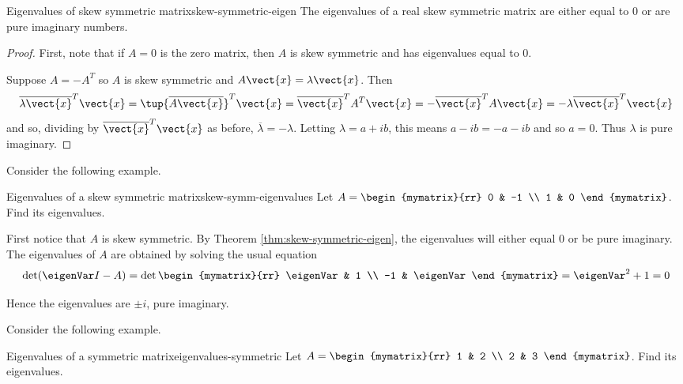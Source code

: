 \begin{theorem}{Eigenvalues of skew symmetric matrix}{skew-symmetric-eigen}
The eigenvalues of a real skew symmetric matrix are either equal to $0$ or are pure imaginary numbers.
\end{theorem}

\begin{proof}
First, note that if $A=0$ is the zero matrix, then $A$ is skew symmetric and has eigenvalues equal to $0$. 

Suppose $A=-A^{T}$ so $A$ is skew symmetric and $A\vect{x}=\lambda 
\vect{x}$. Then 
\begin{equation*}
\overline{\lambda \vect{x}}^{T}\vect{x}=\tup{\overline{A
\vect{x}}} ^{T}\vect{x}=\overline{\vect{x}}^{T}A^{T}\vect{x}=-
\overline{\vect{x}}^{T}A\vect{x}=-\lambda \overline{\vect{x}}^{T}
\vect{x}
\end{equation*}
and so, dividing by $\overline{\vect{x}}^{T}\vect{x}$ as before, $
\overline{\lambda }=-\lambda $. Letting $\lambda =a+ib$, this means $
a-ib=-a-ib$ and so $a=0$. Thus $\lambda $ is pure imaginary. 
\end{proof}

Consider the following example. 

\begin{example}{Eigenvalues of a skew symmetric matrix}{skew-symm-eigenvalues}
Let $A=\begin{mymatrix}{rr}
0 & -1 \\
1 & 0
\end{mymatrix} $.  Find its eigenvalues.
\end{example}

\begin{solution}
First notice that $A$ is skew symmetric. By Theorem \ref{thm:skew-symmetric-eigen}, the eigenvalues will either equal $0$ or be pure imaginary.  The eigenvalues of $A$ are obtained by solving the usual equation 
\[
\det (\eigenVar I - A ) = 
\det \begin{mymatrix}{rr}
\eigenVar & 1 \\ 
-1 & \eigenVar
\end{mymatrix} =\eigenVar ^{2}+1=0
\]

Hence the eigenvalues are $\pm i$, pure
imaginary.
\end{solution}

Consider the following example.

\begin{example}{Eigenvalues of a symmetric matrix}{eigenvalues-symmetric}
Let $A=\begin{mymatrix}{rr}
1 & 2 \\
2 & 3
\end{mymatrix} $. Find its eigenvalues.
\end{example}

